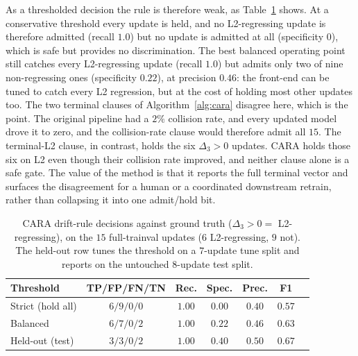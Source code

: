 \documentclass[conference]{IEEEtran}
\begin{document}
As a thresholded decision the rule is therefore weak, as Table~\ref{tab:admission}
shows. At a conservative threshold every update is held, and no L2-regressing update is therefore
admitted (recall $1.0$) but no update is admitted at all (specificity $0$), which
is safe but provides no discrimination. The best balanced operating point still
catches every L2-regressing update (recall $1.0$) but admits only two of nine
non-regressing ones (specificity $0.22$), at precision $0.46$: the front-end can
be tuned to catch every L2 regression, but at the cost of holding most other
updates too. The two terminal clauses of Algorithm~\ref{alg:cara} disagree here,
which is the point. The original pipeline had a $2\%$ collision rate, and every
updated model drove it to zero, and the collision-rate clause would therefore admit all
$15$. The terminal-L2 clause, in contrast, holds the six $\Delta_3>0$ updates.
CARA holds those six on L2 even though their collision rate improved, and neither
clause alone is a safe gate. The value of the method is that it reports the full
terminal vector and surfaces the disagreement for a human or a coordinated
downstream retrain, rather than collapsing it into one admit/hold bit.

\begin{table}[htbp]
\caption{CARA drift-rule decisions against ground truth ($\Delta_3 > 0 =$
L2-regressing), on the $15$ full-trainval updates ($6$ L2-regressing, $9$ not).
The held-out row tunes the threshold on a $7$-update tune split and reports on
the untouched $8$-update test split.}
\label{tab:admission}
\centering
\renewcommand{\arraystretch}{1.2}
\setlength{\tabcolsep}{5pt}
\begin{tabular}{@{}lcccccc@{}}
\toprule
\textbf{Threshold} & \textbf{TP/FP/FN/TN} & \textbf{Rec.} & \textbf{Spec.} & \textbf{Prec.} & \textbf{F1} \\
\midrule
Strict (hold all)      & $6/9/0/0$ & $1.00$ & $0.00$ & $0.40$ & $0.57$ \\
Balanced              & $6/7/0/2$ & $1.00$ & $0.22$ & $0.46$ & $0.63$ \\
Held-out (test)        & $3/3/0/2$ & $1.00$ & $0.40$ & $0.50$ & $0.67$ \\
\bottomrule
\end{tabular}
\end{table}
\end{document}
